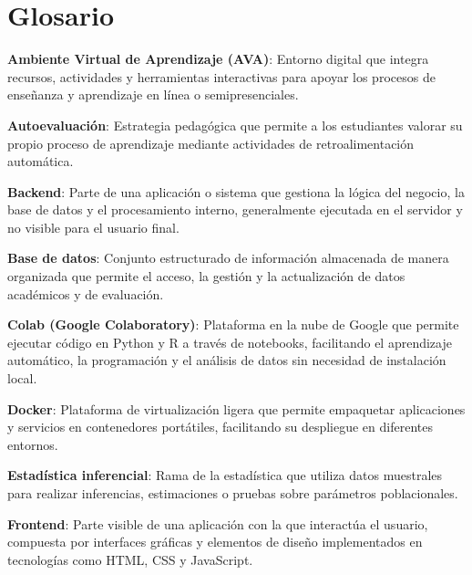 \documentclass[letter,oneside,12pt,spanish]{report}
\begin{document}
\parskip=12pt
\tableofcontents                    

\newpage

\listoffigures                         %
\newpage

\chapter*{Glosario}

\begin{description}

\item \textbf{Ambiente Virtual de Aprendizaje (AVA)}: Entorno digital que integra recursos, actividades y herramientas interactivas para apoyar los procesos de enseñanza y aprendizaje en línea o semipresenciales.
\item \textbf{Autoevaluación}: Estrategia pedagógica que permite a los estudiantes valorar su propio proceso de aprendizaje mediante actividades de retroalimentación automática.
\item \textbf{Backend}: Parte de una aplicación o sistema que gestiona la lógica del negocio, la base de datos y el procesamiento interno, generalmente ejecutada en el servidor y no visible para el usuario final.
\item \textbf{Base de datos}: Conjunto estructurado de información almacenada de manera organizada que permite el acceso, la gestión y la actualización de datos académicos y de evaluación.
\item \textbf{Colab (Google Colaboratory)}: Plataforma en la nube de Google que permite ejecutar código en Python y R a través de notebooks, facilitando el aprendizaje automático, la programación y el análisis de datos sin necesidad de instalación local.
\item \textbf{Docker}: Plataforma de virtualización ligera que permite empaquetar aplicaciones y servicios en contenedores portátiles, facilitando su despliegue en diferentes entornos.
\item \textbf{Estadística inferencial}: Rama de la estadística que utiliza datos muestrales para realizar inferencias, estimaciones o pruebas sobre parámetros poblacionales.
\item \textbf{Frontend}: Parte visible de una aplicación con la que interactúa el usuario, compuesta por interfaces gráficas y elementos de diseño implementados en tecnologías como HTML, CSS y JavaScript.

\end{description}
\end{document}
